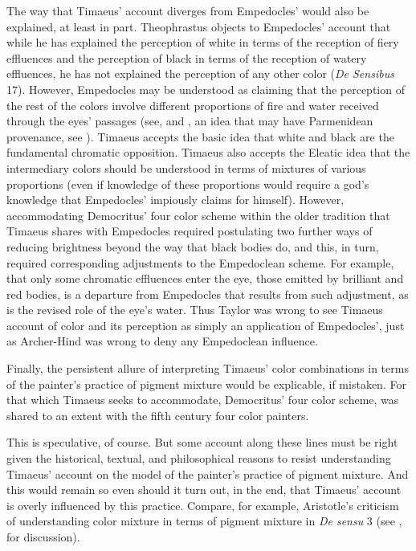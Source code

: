 
The way that Timaeus' account diverges from Empedocles' would also be explained, at least in part. Theophrastus objects to Empedocles' account that while he has explained the perception of white in terms of the reception of fiery effluences and the perception of black in terms of the reception of watery effluences, he has not explained the perception of any other color (\emph{De Sensibus} 17). However, Empedocles may be understood as claiming that the perception of the rest of the colors involve different proportions of fire and water received through the eyes' passages (see, \citealt{Ierodiakonou:2005fk} and \citealt[chapter 5.4]{Kalderon:2015fr}, an idea that may have Parmenidean provenance, see \citealt[5.3]{Kalderon:2015fr}). Timaeus accepts the basic idea that white and black are the fundamental chromatic opposition. Timaeus also accepts the Eleatic idea that the intermediary colors should be understood in terms of mixtures of various proportions (even if knowledge of these proportions would require a god's knowledge that Empedocles' impiously claims for himself). However, accommodating Democritus' four color scheme within the older tradition that Timaeus shares with Empedocles required postulating two further ways of reducing brightness beyond the way that black bodies do, and this, in turn, required corresponding adjustments to the Empedoclean scheme. For example, that only some chromatic effluences enter the eye, those emitted by brilliant and red bodies, is a departure from Empedocles that results from such adjustment, as is the revised role of the eye's water. Thus Taylor was wrong to see Timaeus account of color and its perception as simply an application of Empedocles', just as Archer-Hind was wrong to deny any Empedoclean influence.

Finally, the persistent allure of interpreting Timaeus' color combinations in terms of the painter's practice of pigment mixture would be explicable, if mistaken. For that which Timaeus seeks to accommodate, Democritus' four color scheme, was shared to an extent with the fifth century four color painters.

This is speculative, of course. But some account along these lines must be right given the historical, textual, and philosophical reasons to resist understanding Timaeus' account on the model of the painter's practice of pigment mixture. And this would remain so even should it turn out, in the end, that Timaeus' account is overly influenced by this practice. Compare, for example, Aristotle's criticism of understanding color mixture in terms of pigment mixture in \emph{De sensu} 3 (see \citealt[chapter 6]{Kalderon:2015fr}, for discussion).

